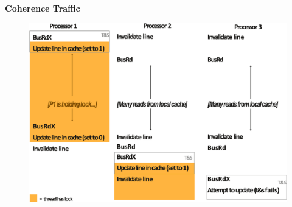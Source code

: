 \begin{flushleft}
    \textcolor{Red2}{ \textbf{Coherence Traffic}}
\end{flushleft}
\begin{figure}[!htp]
    \centering
    \includegraphics[width=\textwidth]{img/test-and-set-2.pdf}
\end{figure}
